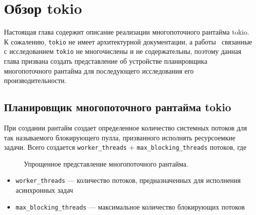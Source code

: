 
\section{Обзор tokio}

Настоящая глава содержит описание реализации многопоточного рантайма tokio. К сожалению, \verb|tokio| не имеет архитектурной документации, а работы~\cite{cringeTokioIOUring} связанные с исследованием \verb|tokio| не многочислены и не содержательны, поэтому данная глава призвана создать представление об устройстве планировщика многопоточного рантайма для последующего исследования его производительности.

\subsection{Планировщик многопоточного рантайма tokio}

При создании рантайм создает определенное количество системных потоков для так называемого блокирующего пулла, призванного исполнять ресурсоемкие задачи. Всего создается \verb|worker_threads| + \verb|max_blocking_threads| потоков, где

\begin{figure}[H]
    \begin{center}
    \end{center}

    \caption{Упрощенное представление многопоточного рантайма.}
    \label{fig:tokio:arch}
\end{figure}

\begin{itemize}
    \item \verb|worker_threads| --- количество потоков, предназначенных для исполнения асинхронных задач
    \item \verb|max_blocking_threads| --- максимальное количество блокирующих потоков
\end{itemize}

